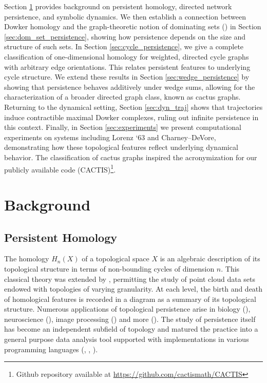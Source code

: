\documentclass[pdflatex,bst/sn-mathphys-num]{sn-jnl}%
\theoremstyle{thmstyleone}%
\theoremstyle{definition}
\theoremstyle{thmstyletwo}%
\theoremstyle{thmstylethree}%
\begin{document}
Section \ref{sec:bg} provides background on persistent homology, directed network persistence, and symbolic dynamics. We then establish a connection between Dowker homology and the graph-theoretic notion of dominating sets (\cite{CARO_Dominating_Number}) in Section \ref{sec:dom_set_persistence}, showing how persistence depends on the size and structure of such sets. In Section \ref{sec:cycle_persistence}, we give a complete classification of one-dimensional homology for weighted, directed cycle graphs with arbitrary edge orientations. This relates persistent features to underlying cycle structure. We extend these results in Section \ref{sec:wedge_persistence} by showing that persistence behaves additively under wedge sums, allowing for the characterization of a broader directed graph class, known as cactus graphs. Returning to the dynamical setting, Section \ref{sec:dyn_traj} shows that trajectories induce contractible maximal Dowker complexes, ruling out infinite persistence in this context. Finally, in Section \ref{sec:experiments} we present computational experiments on systems including Lorenz `63 and Charney–DeVore, demonstrating how these topological features reflect underlying dynamical behavior. The classification of cactus graphs inspired the acronymization for our publicly available code (CACTIS)\footnote{Github repository available at \url{https://github.com/cactismath/CACTIS}}.





\section{Background}\label{sec:bg}

\subsection{Persistent Homology}
The homology $H_n(X)$ of a topological space $X$ is an algebraic description of its topological structure in terms of non-bounding cycles of dimension $n$. This classical theory was extended by \cite{Edelsbrunner2000}, permitting the study of point cloud data sets endowed with topologies of varying granularity. At each level, the birth and death of homological features is recorded in a diagram as a summary of its topological structure. Numerous applications of topological persistence arise in biology (\cite{Nicolau2011}), neuroscience (\cite{Giusti2016}), image processing (\cite{Carlsson2007}) and more (\cite{DONUT}). The study of persistence itself has become an independent subfield of topology and matured the practice into a general purpose data analysis tool supported with implementations in various programming languages (\cite{giotto}, \cite{Fasy2014}, \cite{javaplex}). 
\end{document}
